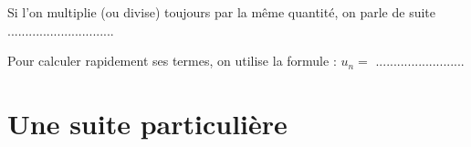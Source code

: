 \documentclass[oneside,12pt]{article}          %
\begin{document}
\begin{tcolorbox}[
    enhanced , arc = 3pt , top = 4mm ,
    fonttitle = \bfseries , title = Je retiens  , boxed title style = {arc = 3pt} ,
    coltitle = black , colbacktitle = white ,
    attach boxed title to top left = {xshift = 5mm , yshift = -4mm} ,
	]
	\restoreskip
	
	Si l'on multiplie (ou divise) toujours par la même quantité, on parle de suite ..............................

	Pour calculer rapidement ses termes, on utilise la formule : $u_n =$ .........................
\end{tcolorbox}



\section{Une suite particulière}
\end{document}
